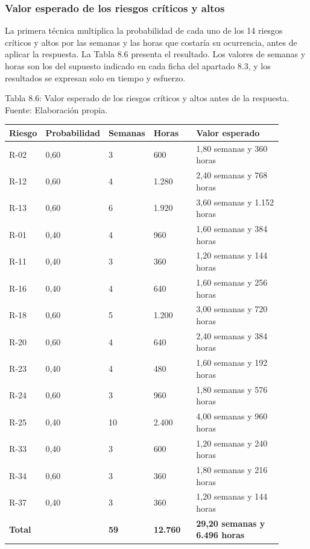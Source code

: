 \documentclass[11pt]{article}
\begin{document}
\subsubsection{Valor esperado de los riesgos críticos y altos}

La primera técnica multiplica la probabilidad de cada uno de los 14 riesgos críticos y altos por las semanas y las horas que costaría su ocurrencia, antes de aplicar la respuesta. La Tabla 8.6 presenta el resultado. Los valores de semanas y horas son los del supuesto indicado en cada ficha del apartado 8.3, y los resultados se expresan solo en tiempo y esfuerzo.

Tabla 8.6: Valor esperado de los riesgos críticos y altos antes de la respuesta. Fuente: Elaboración propia.

\begin{longtable}{p{0.12\linewidth}p{0.12\linewidth}p{0.16\linewidth}p{0.16\linewidth}p{0.34\linewidth}}
\toprule
\textbf{Riesgo} & \textbf{Probabilidad} & \textbf{Semanas} & \textbf{Horas} & \textbf{Valor esperado} \\
\midrule
\endhead
\bottomrule
\endlastfoot
R-02 & 0,60 & 3 & 600 & 1,80 semanas y 360 horas \\
R-12 & 0,60 & 4 & 1.280 & 2,40 semanas y 768 horas \\
R-13 & 0,60 & 6 & 1.920 & 3,60 semanas y 1.152 horas \\
R-01 & 0,40 & 4 & 960 & 1,60 semanas y 384 horas \\
R-11 & 0,40 & 3 & 360 & 1,20 semanas y 144 horas \\
R-16 & 0,40 & 4 & 640 & 1,60 semanas y 256 horas \\
R-18 & 0,60 & 5 & 1.200 & 3,00 semanas y 720 horas \\
R-20 & 0,60 & 4 & 640 & 2,40 semanas y 384 horas \\
R-23 & 0,40 & 4 & 480 & 1,60 semanas y 192 horas \\
R-24 & 0,60 & 3 & 960 & 1,80 semanas y 576 horas \\
R-25 & 0,40 & 10 & 2.400 & 4,00 semanas y 960 horas \\
R-33 & 0,40 & 3 & 600 & 1,20 semanas y 240 horas \\
R-34 & 0,60 & 3 & 360 & 1,80 semanas y 216 horas \\
R-37 & 0,40 & 3 & 360 & 1,20 semanas y 144 horas \\
\textbf{Total} & & \textbf{59} & \textbf{12.760} & \textbf{29,20 semanas y 6.496 horas} \\
\end{longtable}
\end{document}
